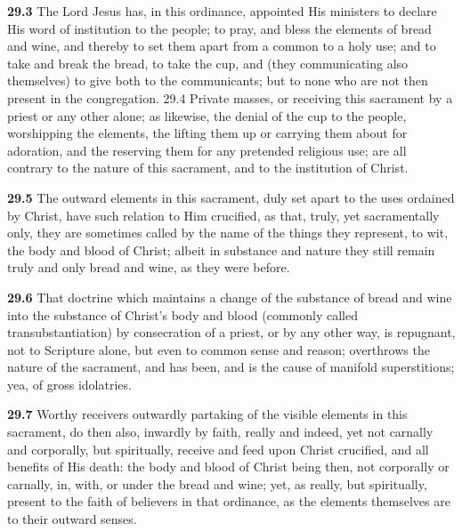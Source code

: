 \par\textbf{29.3} The Lord Jesus has, in this ordinance, appointed His ministers to declare His word of institution to the people; to pray, and bless the elements of bread and wine, and thereby to set them apart from a common to a holy use; and to take and break the bread, to take the cup, and (they communicating also themselves) to give both to the communicants; but to none who are not then present in the congregation.  29.4 Private masses, or receiving this sacrament by a priest or any other alone; as likewise, the denial of the cup to the people, worshipping the elements, the lifting them up or carrying them about for adoration, and the reserving them for any pretended religious use; are all contrary to the nature of this sacrament, and to the institution of Christ.   

\par\textbf{29.5} The outward elements in this sacrament, duly set apart to the uses ordained by Christ, have such relation to Him crucified, as that, truly, yet sacramentally only, they are sometimes called by the name of the things they represent, to wit, the body and blood of Christ; albeit in substance and nature they still remain truly and only bread and wine, as they were before.   

\par\textbf{29.6} That doctrine which maintains a change of the substance of bread and wine into the substance of Christ's body and blood (commonly called transubstantiation) by consecration of a priest, or by any other way, is repugnant, not to Scripture alone, but even to common sense and reason; overthrows the nature of the sacrament, and has been, and is the cause of manifold superstitions; yea, of gross idolatries.   

\par\textbf{29.7} Worthy receivers outwardly partaking of the visible elements in this sacrament, do then also, inwardly by faith, really and indeed, yet not carnally and corporally, but spiritually, receive and feed upon Christ crucified, and all benefits of His death: the body and blood of Christ being then, not corporally or carnally, in, with, or under the bread and wine; yet, as really, but spiritually, present to the faith of believers in that ordinance, as the elements themselves are to their outward senses.   

